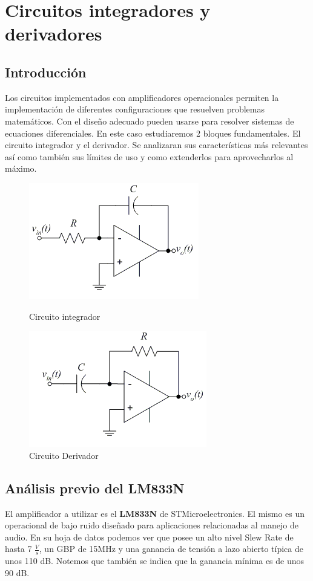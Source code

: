 
\section{Circuitos integradores y derivadores}
\subsection{Introducción}
Los circuitos implementados con amplificadores operacionales permiten la implementación de diferentes configuraciones que resuelven problemas matemáticos. Con el diseño adecuado pueden usarse para resolver sistemas de ecuaciones diferenciales.
En este caso estudiaremos 2 bloques fundamentales. El circuito integrador y el derivador. Se analizaran sus características más relevantes así como también sus límites de uso y como extenderlos para aprovecharlos al máximo.

\begin{figure}[hbt!]
	\includegraphics[scale=1]{Ejercicio4/integrador.png}
	\caption{Circuito integrador} 
	
	\includegraphics{Ejercicio4/derivador}
	\caption{Circuito Derivador} 
	
\end{figure}

\subsection{Análisis previo del \textbf{LM833N}}
El amplificador a utilizar es el \textbf{LM833N} de STMicroelectronics. El mismo es un operacional de bajo ruido diseñado para aplicaciones relacionadas al manejo de audio.
En su hoja de datos podemos ver que posee un alto nivel Slew Rate de hasta 7 $\frac{V}{s}$, un GBP de 15MHz y una ganancia de tensión 
a lazo abierto típica de unos 110 dB. Notemos que también se indica que la ganancia mínima es de unos 90 dB. 


